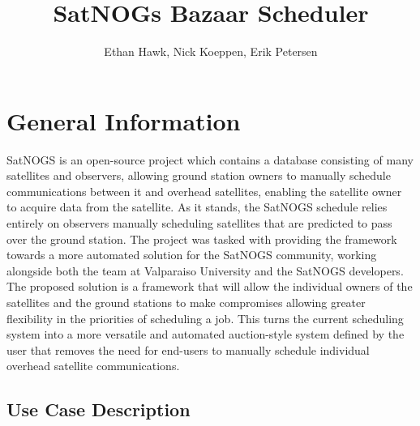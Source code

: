 \documentclass{article}
\author{Ethan Hawk, Nick Koeppen, Erik Petersen}
\title{SatNOGs Bazaar Scheduler}
\begin{document}
\maketitle
\tableofcontents

\section{General Information}

SatNOGS is an open-source project which contains a database consisting of many satellites and observers,
allowing ground station owners to manually schedule communications between it and overhead satellites,
enabling the satellite owner to acquire data from the satellite. As it stands, the SatNOGS schedule
relies entirely on observers manually scheduling satellites that are predicted to pass over the ground
station. The project was tasked with providing the framework towards a more automated solution for the
SatNOGS community, working alongside both the team at Valparaiso University and the SatNOGS developers.
The proposed solution is a framework that will allow the individual owners of the satellites and the
ground stations to make compromises allowing greater flexibility in the priorities of scheduling a job.
This turns the current scheduling system into a more versatile and automated auction-style system
defined by the user that removes the need for end-users to manually schedule individual overhead satellite
communications. 

\subsection{Use Case Description}
\end{document}
